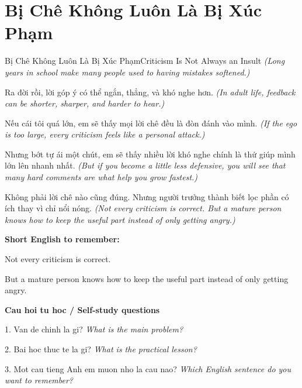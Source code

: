 \section{Bị Chê Không Luôn Là Bị Xúc Phạm}
\begin{truyen}{Bị Chê Không Luôn Là Bị Xúc Phạm}{Criticism Is Not Always an Insult}
\textit{(Long years in school make many people used to having mistakes softened.)}

Ra đời rồi, lời góp ý có thể ngắn, thẳng, và khó nghe hơn.
\textit{(In adult life, feedback can be shorter, sharper, and harder to hear.)}

Nếu cái tôi quá lớn, em sẽ thấy mọi lời chê đều là đòn đánh vào mình.
\textit{(If the ego is too large, every criticism feels like a personal attack.)}

Nhưng bớt tự ái một chút, em sẽ thấy nhiều lời khó nghe chính là thứ giúp mình lớn lên nhanh nhất.
\textit{(But if you become a little less defensive, you will see that many hard comments are what help you grow fastest.)}

\end{truyen}

\begin{baihoc}
Không phải lời chê nào cũng đúng. Nhưng người trưởng thành biết lọc phần có ích thay vì chỉ nổi nóng.
\textit{(Not every criticism is correct. But a mature person knows how to keep the useful part instead of only getting angry.)}
\end{baihoc}

\begin{ghinhoanh}
\textbf{Short English to remember:}

Not every criticism is correct.

But a mature person knows how to keep the useful part instead of only getting angry.

\end{ghinhoanh}

\begin{tuhocnhanh}
\textbf{Cau hoi tu hoc / Self-study questions}

1. Van de chinh la gi? \textit{What is the main problem?}

2. Bai hoc thuc te la gi? \textit{What is the practical lesson?}

3. Mot cau tieng Anh em muon nho la cau nao? \textit{Which English sentence do you want to remember?}
\end{tuhocnhanh}
\ngancach

